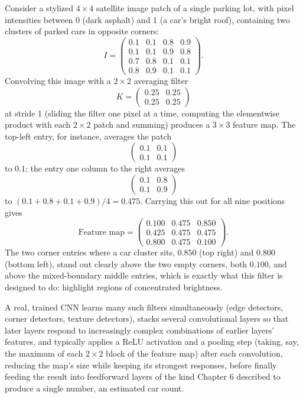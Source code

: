 \documentclass[../ai_in_finance]{subfiles}
\begin{document}
Consider a stylized $4\times4$ satellite image patch of a single parking lot, with pixel intensities between 0 (dark asphalt) and 1 (a car's bright roof), containing two clusters of parked cars in opposite corners:
\begin{equation*}
I = \begin{pmatrix} 0.1 & 0.1 & 0.8 & 0.9 \\ 0.1 & 0.1 & 0.9 & 0.8 \\ 0.7 & 0.8 & 0.1 & 0.1 \\ 0.8 & 0.9 & 0.1 & 0.1 \end{pmatrix}.
\end{equation*}
Convolving this image with a $2\times2$ averaging filter
$$K = \begin{pmatrix}0.25 & 0.25\\ 0.25 & 0.25\end{pmatrix}$$
at stride 1 (sliding the filter one pixel at a time, computing the elementwise product with each $2\times2$ patch and summing) produces a $3\times3$ feature map. The top-left entry, for instance, averages the patch
$$\begin{pmatrix}0.1&0.1\\0.1&0.1\end{pmatrix}$$
to $0.1$; the entry one column to the right averages
$$\begin{pmatrix}0.1&0.8\\0.1&0.9\end{pmatrix}$$
to $(0.1+0.8+0.1+0.9)/4 = 0.475$. Carrying this out for all nine positions gives
\begin{equation*}
\text{Feature map} = \begin{pmatrix} 0.100 & 0.475 & 0.850 \\ 0.425 & 0.475 & 0.475 \\ 0.800 & 0.475 & 0.100 \end{pmatrix}.
\end{equation*}
The two corner entries where a car cluster sits, $0.850$ (top right) and $0.800$ (bottom left), stand out clearly above the two empty corners, both $0.100$, and above the mixed-boundary middle entries, which is exactly what this filter is designed to do: highlight regions of concentrated brightness.

A real, trained CNN learns many such filters simultaneously (edge detectors, corner detectors, texture detectors), stacks several convolutional layers so that later layers respond to increasingly complex combinations of earlier layers' features, and typically applies a ReLU activation and a pooling step (taking, say, the maximum of each $2\times2$ block of the feature map) after each convolution, reducing the map's size while keeping its strongest responses, before finally feeding the result into feedforward layers of the kind Chapter 6 described to produce a single number, an estimated car count.
\end{document}

